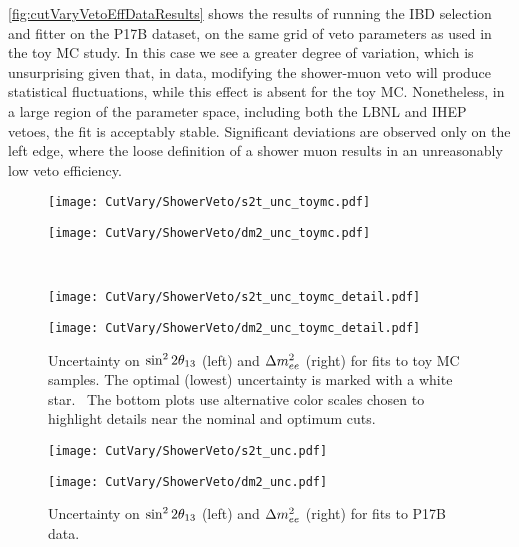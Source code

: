 \documentclass[../thesis.tex]{subfiles}
\begin{document}
\autoref{fig:cutVaryVetoEffDataResults} shows the results of running the IBD selection and fitter on the P17B dataset, on the same grid of veto parameters as used in the toy MC study. In this case we see a greater degree of variation, which is unsurprising given that, in data, modifying the shower-muon veto will produce statistical fluctuations, while this effect is absent for the toy MC. Nonetheless, in a large region of the parameter space, including both the LBNL and IHEP vetoes, the fit is acceptably stable. Significant deviations are observed only on the left edge, where the loose definition of a shower muon results in an unreasonably low veto efficiency.

\newcommand\fourShowerNote{The optimal (lowest) uncertainty is marked with a white star. \marknom\ The bottom plots use alternative color scales chosen to highlight details near the nominal and optimum cuts.}

\begin{figure}[ht]
  \begin{minipage}{0.5\linewidth}%
    \texttt{[image: CutVary/ShowerVeto/s2t\_unc\_toymc.pdf]}%
  \end{minipage}%
  \begin{minipage}{0.5\linewidth}%
    \texttt{[image: CutVary/ShowerVeto/dm2\_unc\_toymc.pdf]}%
  \end{minipage}\\
  \begin{minipage}{0.5\linewidth}%
    \texttt{[image: CutVary/ShowerVeto/s2t\_unc\_toymc\_detail.pdf]}%
  \end{minipage}%
  \begin{minipage}{0.5\linewidth}%
    \texttt{[image: CutVary/ShowerVeto/dm2\_unc\_toymc\_detail.pdf]}%
  \end{minipage}%
  \caption{Uncertainty on $\sin^2 2\theta_{13}$ (left) and $\Delta m^2_{ee}$ (right) for fits to toy MC samples. \fourShowerNote}
  \label{fig:cutVaryVetoEffToyUnc}
\end{figure}

\begin{figure}[ht]
  \begin{minipage}{0.5\linewidth}%
    \texttt{[image: CutVary/ShowerVeto/s2t\_unc.pdf]}%
  \end{minipage}%
  \begin{minipage}{0.5\linewidth}%
    \texttt{[image: CutVary/ShowerVeto/dm2\_unc.pdf]}%
  \end{minipage}%
  \caption{Uncertainty on $\sin^2 2\theta_{13}$ (left) and $\Delta m^2_{ee}$ (right) for fits to P17B data.}
  \label{fig:cutVaryVetoEffDataUnc}
\end{figure}
\end{document}
